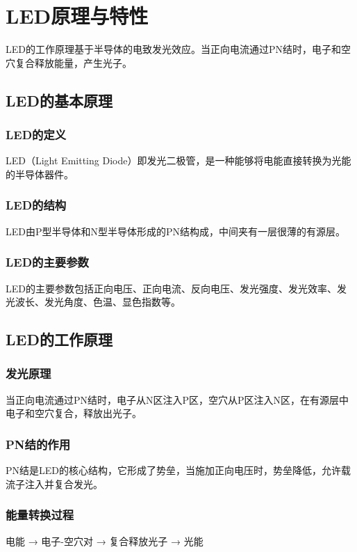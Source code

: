 \section{LED原理与特性}
\label{sec:led_principle}

LED的工作原理基于半导体的电致发光效应。当正向电流通过PN结时，电子和空穴复合释放能量，产生光子。

\subsection{LED的基本原理}

\subsubsection{LED的定义}
LED（Light Emitting Diode）即发光二极管，是一种能够将电能直接转换为光能的半导体器件。

\subsubsection{LED的结构}
LED由P型半导体和N型半导体形成的PN结构成，中间夹有一层很薄的有源层。

\subsubsection{LED的主要参数}
LED的主要参数包括正向电压、正向电流、反向电压、发光强度、发光效率、发光波长、发光角度、色温、显色指数等。

\subsection{LED的工作原理}

\subsubsection{发光原理}
当正向电流通过PN结时，电子从N区注入P区，空穴从P区注入N区，在有源层中电子和空穴复合，释放出光子。

\subsubsection{PN结的作用}
PN结是LED的核心结构，它形成了势垒，当施加正向电压时，势垒降低，允许载流子注入并复合发光。

\subsubsection{能量转换过程}
电能 → 电子-空穴对 → 复合释放光子 → 光能

